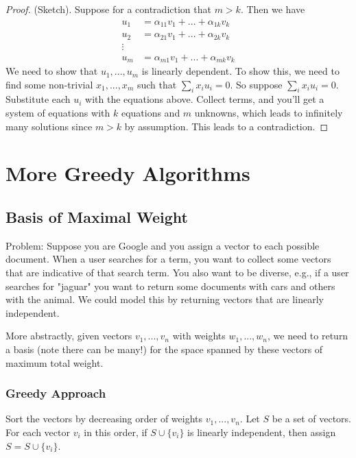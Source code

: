 \begin{proof}
    (Sketch). Suppose for a contradiction that $m > k$. Then we have
    \begin{align*}
        u_1 &= \alpha_{11}v_1 + ... + \alpha_{1k}v_k \\
        u_2 &= \alpha_{21}v_1 + ... + \alpha_{2k}v_k \\
        \vdots \\
        u_m &= \alpha_{m1}v_1 + ... + \alpha_{mk}v_k
    \end{align*}
    We need to show that $u_1, ..., u_m$ is linearly dependent. To
    show this, we need to find some non-trivial $x_1, ..., x_m$ such
    that $\sum_i x_iu_i = 0$. So suppose $\sum_i x_iu_i = 0$.
    Substitute each $u_i$ with the equations above. Collect terms, and
    you'll get a system of equations with $k$ equations and $m$
    unknowns, which leads to infinitely many solutions since $m > k$
    by assumption. This leads to a contradiction.
\end{proof}

\section{More Greedy Algorithms}

\subsection{Basis of Maximal Weight}

Problem: Suppose you are Google and you assign a vector to each
possible
document. When a user searches for a term, you want to collect some
vectors that are indicative of that search term. You also want to be
diverse, e.g., if a user searches for "jaguar" you want to return
some documents with cars and others with the animal. We could model
this by returning vectors that are linearly independent.

More abstractly, given vectors $v_1, ..., v_n$ with weights $w_1, ...,
w_n$, we need to return a basis (note there can be many!) for the
space spanned by these vectors of maximum total weight.

\subsubsection{Greedy Approach}

Sort the vectors by decreasing order of weights $v_1, ..., v_n$. Let
$S$ be a set of vectors. For each vector $v_i$ in this order, if $S
\cup \{v_i\}$ is linearly independent, then assign $S = S \cup 
\{v_i\}$.


